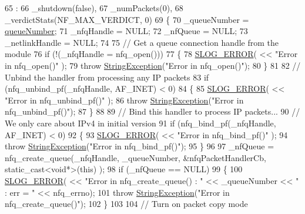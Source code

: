 \begin{DoxyCode}
65                                              :
66     \_shutdown(\textcolor{keyword}{false}),
67     \_numPackets(0),
68     \_verdictStats(NF\_MAX\_VERDICT, 0)
69 \{
70     \_queueNumber = \hyperlink{class_vsid_netfilter_1_1_packet_handler_a0ae07d1e28782fae0302f9e09e3dbf58}{queueNumber};
71     \_nfqHandle = NULL;
72     \_nfQueue = NULL;
73     \_netlinkHandle = NULL;
74 
75     \textcolor{comment}{// Get a queue connection handle from the module}
76     \textcolor{keywordflow}{if} (!(\_nfqHandle = nfq\_open())) 
77     \{
78         \hyperlink{_logger_8h_a2a8694cd392d18f4db6b9cc9f15bafe3}{SLOG\_ERROR}( << \textcolor{stringliteral}{"Error in nfq\_open()"} );
79         \textcolor{keywordflow}{throw} \hyperlink{class_vsid_common_1_1_string_exception}{StringException}(\textcolor{stringliteral}{"Error in nfq\_open()"});
80     \}
81 
82     \textcolor{comment}{// Unbind the handler from processing any IP packets}
83     \textcolor{keywordflow}{if} (nfq\_unbind\_pf(\_nfqHandle, AF\_INET) < 0) 
84     \{
85         \hyperlink{_logger_8h_a2a8694cd392d18f4db6b9cc9f15bafe3}{SLOG\_ERROR}( << \textcolor{stringliteral}{"Error in nfq\_unbind\_pf()"} );
86         \textcolor{keywordflow}{throw} \hyperlink{class_vsid_common_1_1_string_exception}{StringException}(\textcolor{stringliteral}{"Error in nfq\_unbind\_pf()"});
87     \}
88 
89     \textcolor{comment}{// Bind this handler to process IP packets...}
90     \textcolor{comment}{// We only care about IPv4 in initial version}
91     \textcolor{keywordflow}{if} (nfq\_bind\_pf(\_nfqHandle, AF\_INET) < 0) 
92     \{
93         \hyperlink{_logger_8h_a2a8694cd392d18f4db6b9cc9f15bafe3}{SLOG\_ERROR}( << \textcolor{stringliteral}{"Error in nfq\_bind\_pf()"} );
94         \textcolor{keywordflow}{throw} \hyperlink{class_vsid_common_1_1_string_exception}{StringException}(\textcolor{stringliteral}{"Error in nfq\_bind\_pf()"});
95     \}
96 
97     \_nfQueue = nfq\_create\_queue(\_nfqHandle, \_queueNumber, &nfqPacketHandlerCb, static\_cast<void*>(\textcolor{keyword}{this}) );
98     \textcolor{keywordflow}{if} (\_nfQueue == NULL) 
99     \{
100         \hyperlink{_logger_8h_a2a8694cd392d18f4db6b9cc9f15bafe3}{SLOG\_ERROR}( << \textcolor{stringliteral}{"Error in nfq\_create\_queue() : "} << \_queueNumber << \textcolor{stringliteral}{" : err = "} << 
      nfq\_errno);
101         \textcolor{keywordflow}{throw} \hyperlink{class_vsid_common_1_1_string_exception}{StringException}(\textcolor{stringliteral}{"Error in nfq\_create\_queue()"});
102     \}
103 
104     \textcolor{comment}{// Turn on packet copy mode}

\end{DoxyCode}
